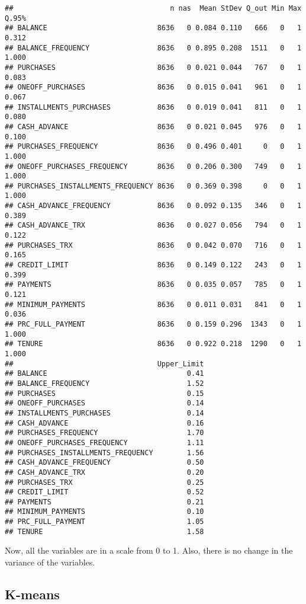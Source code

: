 \documentclass[11pt,]{article}
\begin{document}
\begin{verbatim}
##                                     n nas  Mean StDev Q_out Min Max Q.95%
## BALANCE                          8636   0 0.084 0.110   666   0   1 0.312
## BALANCE_FREQUENCY                8636   0 0.895 0.208  1511   0   1 1.000
## PURCHASES                        8636   0 0.021 0.044   767   0   1 0.083
## ONEOFF_PURCHASES                 8636   0 0.015 0.041   961   0   1 0.067
## INSTALLMENTS_PURCHASES           8636   0 0.019 0.041   811   0   1 0.080
## CASH_ADVANCE                     8636   0 0.021 0.045   976   0   1 0.100
## PURCHASES_FREQUENCY              8636   0 0.496 0.401     0   0   1 1.000
## ONEOFF_PURCHASES_FREQUENCY       8636   0 0.206 0.300   749   0   1 1.000
## PURCHASES_INSTALLMENTS_FREQUENCY 8636   0 0.369 0.398     0   0   1 1.000
## CASH_ADVANCE_FREQUENCY           8636   0 0.092 0.135   346   0   1 0.389
## CASH_ADVANCE_TRX                 8636   0 0.027 0.056   794   0   1 0.122
## PURCHASES_TRX                    8636   0 0.042 0.070   716   0   1 0.165
## CREDIT_LIMIT                     8636   0 0.149 0.122   243   0   1 0.399
## PAYMENTS                         8636   0 0.035 0.057   785   0   1 0.121
## MINIMUM_PAYMENTS                 8636   0 0.011 0.031   841   0   1 0.036
## PRC_FULL_PAYMENT                 8636   0 0.159 0.296  1343   0   1 1.000
## TENURE                           8636   0 0.922 0.218  1290   0   1 1.000
##                                  Upper_Limit
## BALANCE                                 0.41
## BALANCE_FREQUENCY                       1.52
## PURCHASES                               0.15
## ONEOFF_PURCHASES                        0.14
## INSTALLMENTS_PURCHASES                  0.14
## CASH_ADVANCE                            0.16
## PURCHASES_FREQUENCY                     1.70
## ONEOFF_PURCHASES_FREQUENCY              1.11
## PURCHASES_INSTALLMENTS_FREQUENCY        1.56
## CASH_ADVANCE_FREQUENCY                  0.50
## CASH_ADVANCE_TRX                        0.20
## PURCHASES_TRX                           0.25
## CREDIT_LIMIT                            0.52
## PAYMENTS                                0.21
## MINIMUM_PAYMENTS                        0.10
## PRC_FULL_PAYMENT                        1.05
## TENURE                                  1.58
\end{verbatim}

Now, all the variables are in a scale from 0 to 1. Also, there is no
change in the variance of the variables.

\subsection{\texorpdfstring{\textbf{K-means}}{K-means}}\label{k-means}
\end{document}
